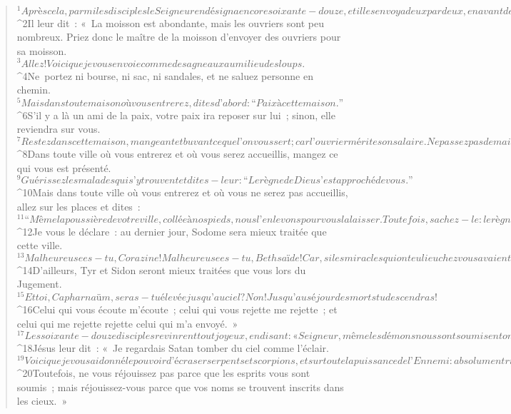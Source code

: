          
      \bchapter{}
      \begin{verse}
${}^{1}Après cela, parmi les disciples le Seigneur en désigna encore soixante-douze, et il les envoya deux par deux, en avant de lui, en toute ville et localité où lui-même allait se rendre. 
${}^{2}Il leur dit : « La moisson est abondante, mais les ouvriers sont peu nombreux. Priez donc le maître de la moisson d’envoyer des ouvriers pour sa moisson. 
${}^{3}Allez ! Voici que je vous envoie comme des agneaux au milieu des loups. 
${}^{4}Ne portez ni bourse, ni sac, ni sandales, et ne saluez personne en chemin. 
${}^{5}Mais dans toute maison où vous entrerez, dites d’abord : “Paix à cette maison.” 
${}^{6}S’il y a là un ami de la paix, votre paix ira reposer sur lui ; sinon, elle reviendra sur vous. 
${}^{7}Restez dans cette maison, mangeant et buvant ce que l’on vous sert ; car l’ouvrier mérite son salaire. Ne passez pas de maison en maison. 
${}^{8}Dans toute ville où vous entrerez et où vous serez accueillis, mangez ce qui vous est présenté. 
${}^{9}Guérissez les malades qui s’y trouvent et dites-leur : “Le règne de Dieu s’est approché de vous.” 
${}^{10}Mais dans toute ville où vous entrerez et où vous ne serez pas accueillis, allez sur les places et dites : 
${}^{11}“Même la poussière de votre ville, collée à nos pieds, nous l’enlevons pour vous la laisser. Toutefois, sachez-le : le règne de Dieu s’est approché.” 
${}^{12}Je vous le déclare : au dernier jour, Sodome sera mieux traitée que cette ville.
${}^{13}Malheureuse es-tu, Corazine ! Malheureuse es-tu, Bethsaïde ! Car, si les miracles qui ont eu lieu chez vous avaient eu lieu à Tyr et à Sidon, il y a longtemps que leurs habitants auraient fait pénitence, avec le sac et la cendre. 
${}^{14}D’ailleurs, Tyr et Sidon seront mieux traitées que vous lors du Jugement. 
${}^{15}Et toi, Capharnaüm, seras-tu élevée jusqu’au ciel ? Non ! Jusqu’au séjour des morts tu descendras !
${}^{16}Celui qui vous écoute m’écoute ; celui qui vous rejette me rejette ; et celui qui me rejette rejette celui qui m’a envoyé. »
${}^{17}Les soixante-douze disciples revinrent tout joyeux, en disant : « Seigneur, même les démons nous sont soumis en ton nom. »
${}^{18}Jésus leur dit : « Je regardais Satan tomber du ciel comme l’éclair. 
${}^{19}Voici que je vous ai donné le pouvoir d’écraser serpents et scorpions, et sur toute la puissance de l’Ennemi : absolument rien ne pourra vous nuire. 
${}^{20}Toutefois, ne vous réjouissez pas parce que les esprits vous sont soumis ; mais réjouissez-vous parce que vos noms se trouvent inscrits dans les cieux. »

\end{verse}
